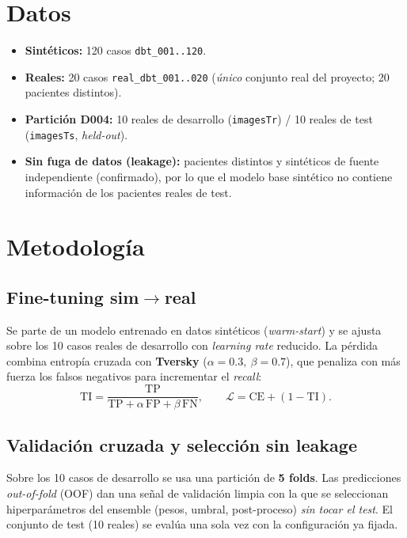 \documentclass[11pt]{article}
\begin{document}
\section{Datos}
\begin{itemize}\itemsep2pt
  \item \textbf{Sintéticos:} 120 casos \texttt{dbt\_001..120}.
  \item \textbf{Reales:} 20 casos \texttt{real\_dbt\_001..020} (\emph{único} conjunto real del proyecto; 20 pacientes distintos).
  \item \textbf{Partición D004:} 10 reales de desarrollo (\texttt{imagesTr}) / 10 reales de test (\texttt{imagesTs}, \emph{held-out}).
  \item \textbf{Sin fuga de datos (leakage):} pacientes distintos y sintéticos de fuente independiente (confirmado), por lo que el modelo base sintético no contiene información de los pacientes reales de test.
\end{itemize}

\section{Metodología}
\subsection{Fine-tuning sim$\rightarrow$real}
Se parte de un modelo entrenado en datos sintéticos (\emph{warm-start}) y se ajusta
sobre los 10 casos reales de desarrollo con \emph{learning rate} reducido. La pérdida
combina entropía cruzada con \textbf{Tversky} ($\alpha{=}0.3,\ \beta{=}0.7$), que
penaliza con más fuerza los falsos negativos para incrementar el \emph{recall}:
\begin{equation}
\mathrm{TI} = \frac{\mathrm{TP}}{\mathrm{TP} + \alpha\,\mathrm{FP} + \beta\,\mathrm{FN}},
\qquad \mathcal{L} = \mathrm{CE} + (1-\mathrm{TI}).
\end{equation}

\subsection{Validación cruzada y selección sin leakage}
Sobre los 10 casos de desarrollo se usa una partición de \textbf{5 folds}. Las
predicciones \emph{out-of-fold} (OOF) dan una señal de validación limpia con la que se
seleccionan hiperparámetros del ensemble (pesos, umbral, post-proceso) \emph{sin tocar
el test}. El conjunto de test (10 reales) se evalúa una sola vez con la configuración
ya fijada.
\end{document}

